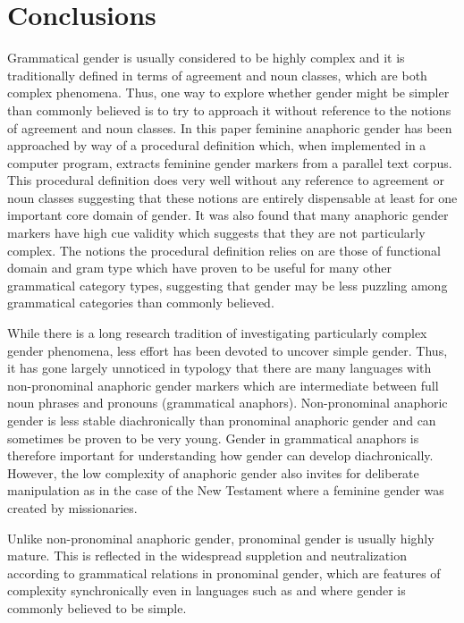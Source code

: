 \documentclass[output=collectionpaper]{langsci/langscibook}
\begin{document}
\section{Conclusions}
\label{sec:BW:7}

Grammatical gender is usually considered to be highly complex and it is traditionally defined in terms of agreement and noun classes, which are both complex phenomena. Thus, one way to explore whether gender might be simpler than commonly believed is to try to approach it without reference to the notions of agreement and noun classes. In this paper feminine anaphoric gender has been approached by way of a procedural definition which, when implemented in a computer program, extracts feminine gender markers from a parallel text corpus. This procedural definition does very well without any reference to agreement or noun classes suggesting that these notions are entirely dispensable at least for one important core domain of gender. It was also found that many anaphoric gender markers have high cue validity which suggests that they are not particularly complex. The notions the procedural definition relies on are those of functional domain and gram type which have proven to be useful for many other grammatical category types, suggesting that gender may be less puzzling among grammatical categories than commonly believed.

While there is a long research tradition of investigating particularly complex gender phenomena, less effort has been devoted to uncover simple gender. Thus, it has gone largely unnoticed in typology that there are many languages with non-pronominal anaphoric gender markers which are intermediate between full noun phrases and pronouns (grammatical anaphors). Non-pronominal anaphoric gender is less stable diachronically than pronominal anaphoric gender and can sometimes be proven to be very young. Gender in grammatical anaphors is therefore important for understanding how gender can develop diachronically. However, the low complexity of anaphoric gender also invites for deliberate manipulation as in the case of the  New Testament where a feminine gender was created by missionaries.

Unlike non-pronominal anaphoric gender, pronominal gender is usually highly mature. This is reflected in the widespread suppletion and neutralization according to grammatical relations in pronominal gender, which are features of complexity synchronically even in languages such as  and  where gender is commonly believed to be simple.
\end{document}
